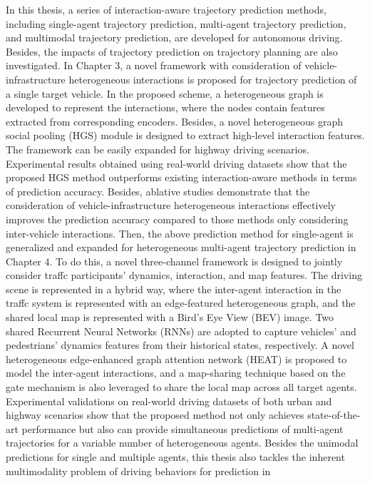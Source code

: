 In this thesis, a series of interaction-aware trajectory prediction methods, including single-agent trajectory prediction, multi-agent trajectory prediction, and multimodal trajectory prediction, are developed for autonomous driving. Besides, the
impacts of trajectory prediction on trajectory planning are also investigated.
In Chapter 3, a novel framework with consideration of vehicle-infrastructure heterogeneous interactions is proposed for trajectory prediction of a single target vehicle. In the proposed scheme, a heterogeneous graph is developed to represent
the interactions, where the nodes contain features extracted from corresponding
encoders. Besides, a novel heterogeneous graph social pooling (HGS) module is
designed to extract high-level interaction features. The framework can be easily expanded for highway driving scenarios. Experimental results obtained using
real-world driving datasets show that the proposed HGS method outperforms existing interaction-aware methods in terms of prediction accuracy. Besides, ablative
studies demonstrate that the consideration of vehicle-infrastructure heterogeneous
interactions effectively improves the prediction accuracy compared to those methods only considering inter-vehicle interactions.
Then, the above prediction method for single-agent is generalized and expanded
for heterogeneous multi-agent trajectory prediction in Chapter 4. To do this, a
novel three-channel framework is designed to jointly consider traffc participants’
dynamics, interaction, and map features. The driving scene is represented in a hybrid way, where the inter-agent interaction in the traffc system is represented with
an edge-featured heterogeneous graph, and the shared local map is represented
with a Bird’s Eye View (BEV) image. Two shared Recurrent Neural Networks
(RNNs) are adopted to capture vehicles’ and pedestrians’ dynamics features from
their historical states, respectively. A novel heterogeneous edge-enhanced graph
attention network (HEAT) is proposed to model the inter-agent interactions, and
a map-sharing technique based on the gate mechanism is also leveraged to share the
local map across all target agents. Experimental validations on real-world driving
datasets of both urban and highway scenarios show that the proposed method not
only achieves state-of-the-art performance but also can provide simultaneous predictions of multi-agent trajectories for a variable number of heterogeneous agents.
Besides the unimodal predictions for single and multiple agents, this thesis also
tackles the inherent multimodality problem of driving behaviors for prediction in
